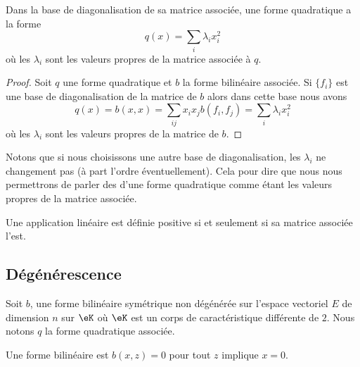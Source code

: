 \begin{proposition}\label{PropFWYooQXfcVY}
    Dans la base de diagonalisation de sa matrice associée, une forme quadratique a la forme
    \begin{equation}
        q(x)=\sum_i\lambda_ix_i^2
    \end{equation}
    où les \( \lambda_i\) sont les valeurs propres de la matrice associée à \( q\).
\end{proposition}

\begin{proof}
Soit \( q\) une forme quadratique et \( b\) la forme bilinéaire associée. Si \( \{ f_i \}\) est une base de diagonalisation de la matrice de \( b\) alors dans cette base nous avons
\begin{equation}
    q(x)=b(x,x)=\sum_{ij}x_ix_jb(f_i,f_j)=\sum_i\lambda_ix_i^2
\end{equation}
où les \( \lambda_i\) sont les valeurs propres de la matrice de \( b\).
\end{proof}
Notons que si nous choisissons une autre base de diagonalisation, les \( \lambda_i\) ne changement pas (à part l'ordre éventuellement). Cela pour dire que nous nous permettrons de parler des  d'une forme quadratique comme étant les valeurs propres de la matrice associée.

\begin{proposition}     \label{PROPooUAAFooEGVDRC}
    Une application linéaire est définie positive si et seulement si sa matrice associée l'est.
\end{proposition}

\subsection{Dégénérescence}

Soit \( b\), une forme bilinéaire symétrique non dégénérée  sur l'espace vectoriel \( E\) de dimension \( n\) sur \( \eK\) où \( \eK\) est un corps de caractéristique différente de \( 2\). Nous notons \( q\) la forme quadratique associée.

\begin{definition}
    Une forme bilinéaire est  \( b(x,z)=0\) pour tout \( z\) implique \( x=0\).
\end{definition}

